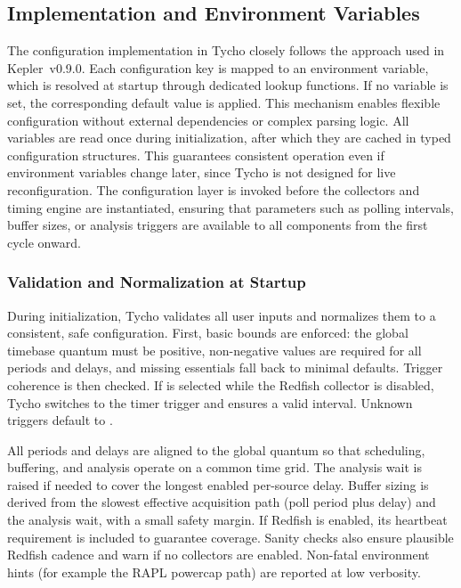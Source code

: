 \subsection{Implementation and Environment Variables}
\label{subsubsec:tycho_config_env}
The configuration implementation in Tycho closely follows the approach used in Kepler~v0.9.0.
Each configuration key is mapped to an environment variable, which is resolved at startup through dedicated lookup functions.
If no variable is set, the corresponding default value is applied.
This mechanism enables flexible configuration without external dependencies or complex parsing logic.
All variables are read once during initialization, after which they are cached in typed configuration structures.
This guarantees consistent operation even if environment variables change later, since Tycho is not designed for live reconfiguration.
The configuration layer is invoked before the collectors and timing engine are instantiated,
ensuring that parameters such as polling intervals, buffer sizes, or analysis triggers are available to all components from the first cycle onward.

\subsubsection{Validation and Normalization at Startup}
\label{subsubsec:tycho_config_validate}

During initialization, Tycho validates all user inputs and normalizes them to a consistent, safe configuration.
First, basic bounds are enforced: the global timebase quantum must be positive, non-negative values are required for all periods and delays, and missing essentials fall back to minimal defaults.
Trigger coherence is then checked. If  is selected while the Redfish collector is disabled, Tycho switches to the timer trigger and ensures a valid interval. Unknown triggers default to .

All periods and delays are aligned to the global quantum so that scheduling, buffering, and analysis operate on a common time grid.
The analysis wait  is raised if needed to cover the longest enabled per-source delay.
Buffer sizing is derived from the slowest effective acquisition path (poll period plus delay) and the analysis wait, with a small safety margin.
If Redfish is enabled, its heartbeat requirement is included to guarantee coverage.
Sanity checks also ensure plausible Redfish cadence and warn if no collectors are enabled.
Non-fatal environment hints (for example the RAPL powercap path) are reported at low verbosity.


